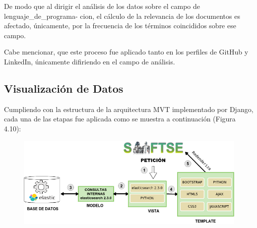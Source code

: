 De modo que al dirigir el análisis de los datos sobre el campo de lenguaje\_de\_programa- cion, el cálculo de la relevancia de los documentos es afectado, únicamente, por la frecuencia de los términos coincididos sobre ese campo. 

Cabe mencionar, que este proceso fue aplicado tanto en los perfiles de GitHub y LinkedIn, únicamente difiriendo en el campo de análisis.



%
%

\subsection{Visualización de Datos}
\label{subsec:subsec04}

Cumpliendo con la estructura de la arquitectura MVT implementado por Django, cada una de las etapas fue aplicada como se muestra a continuación (Figura 4.10):

\begin{figure}[H]
	\centering
	\includegraphics[height=0.24\textheight]{fig01/mvt_process}
	\label{fig:RHP02}
\end{figure}

